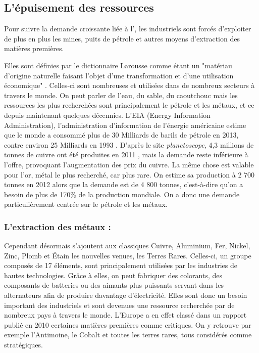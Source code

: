 \subsection{L’épuisement des ressources}

Pour suivre la demande croissante liée à l'\op, les industriels sont forcés d'exploiter de plus en plus les mines, puits de pétrole et autres moyens d'extraction des matières premières.

\bigbreak Elles sont définies par le dictionnaire Larousse comme étant un "matériau d'origine naturelle faisant l'objet d'une transformation et d'une utilisation économique" \cite{LarousseMatiere1eres}. Celles-ci sont nombreuses et utilisées dans de nombreux secteurs à travers le monde. On peut parler de l'eau, du sable, du caoutchouc mais les ressources les plus recherchées sont principalement le pétrole et les métaux, et ce depuis maintenant quelques décennies. L'EIA (Energy Information Administration), l'administration d'information de l'énergie américaine estime que le monde a consommé plus de 30 Milliards de barils de pétrole en 2013, contre environ 25 Milliards en 1993 \cite{EAI}. D'après le site \textit{planetoscope}, 4,3 millions de tonnes de cuivre ont été produites en 2011 \cite{planetoscopeOrCuivre}, mais la demande reste inférieure à l'offre, provoquant l'augmentation des prix du cuivre. La même chose est valable pour l'or, métal le plus recherché, car plus rare. On estime sa production à 2 700 tonnes en 2012 alors que la demande est de 4 800 tonnes, c'est-à-dire qu'on a besoin de plus de 170\% de la production mondiale. On a donc une demande particulièrement centrée sur le pétrole et les métaux.


\subsubsection{L'extraction des métaux : }

Cependant désormais s'ajoutent aux classiques Cuivre, Aluminium, Fer, Nickel, Zinc, Plomb et Étain les nouvelles venues, les Terres Rares. Celles-ci, un groupe composés de 17 éléments, sont principalement utilisées par les industries de hautes technologies. Grâce à elles, on peut fabriquer des colorants, des composants de batteries ou des aimants plus puissants servant dans les alternateurs afin de produire davantage d’électricité. Elles sont donc un besoin important des industriels et sont devenues une ressource recherchée par de nombreux pays à travers le monde. L'Europe a en effet classé dans un rapport publié en 2010 \cite{RapportEuropeenTerresRares} certaines matières premières comme critiques. On y retrouve par exemple l'Antimoine, le Cobalt et toutes les terres rares, tous considérés comme stratégiques.

